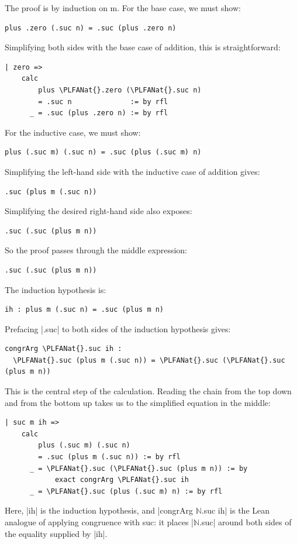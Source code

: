 \documentclass{memoir}
\newcommand{\PLFANat}{\ensuremath{\mathbb{N}}}
\begin{document}
\par
\par\noindent The proof is by induction on m. For the base case, we must show:\begin{verbatim}
plus .zero (.suc n) = .suc (plus .zero n)
\end{verbatim}
Simplifying both sides with the base case of addition, this is straightforward:\begin{verbatim}
| zero =>
    calc
        plus \PLFANat{}.zero (\PLFANat{}.suc n)
        = .suc n              := by rfl
      _ = .suc (plus .zero n) := by rfl
\end{verbatim}

\par
\par\noindent For the inductive case, we must show:\begin{verbatim}
plus (.suc m) (.suc n) = .suc (plus (.suc m) n)
\end{verbatim}
Simplifying the left-hand side with the inductive case of addition gives:\begin{verbatim}
.suc (plus m (.suc n))
\end{verbatim}
Simplifying the desired right-hand side also exposes:\begin{verbatim}
.suc (.suc (plus m n))
\end{verbatim}
So the proof passes through the middle expression:\begin{verbatim}
.suc (.suc (plus m n))
\end{verbatim}
The induction hypothesis is:\begin{verbatim}
ih : plus m (.suc n) = .suc (plus m n)
\end{verbatim}
Prefacing \LeanVerb|.suc| to both sides of the induction hypothesis gives:\begin{verbatim}
congrArg \PLFANat{}.suc ih :
  \PLFANat{}.suc (plus m (.suc n)) = \PLFANat{}.suc (\PLFANat{}.suc (plus m n))
\end{verbatim}
This is the central step of the calculation. Reading the chain from the
top down and from the bottom up takes us to the simplified equation in the
middle:\begin{verbatim}
| suc m ih =>
    calc
        plus (.suc m) (.suc n)
        = .suc (plus m (.suc n)) := by rfl
      _ = \PLFANat{}.suc (\PLFANat{}.suc (plus m n)) := by
            exact congrArg \PLFANat{}.suc ih
      _ = \PLFANat{}.suc (plus (.suc m) n) := by rfl
\end{verbatim}
Here, \LeanVerb|ih| is the induction hypothesis, and \LeanVerb|congrArg \PLFANat{}.suc ih| is the Lean
analogue of applying congruence with suc: it places \LeanVerb|\PLFANat{}.suc| around both sides
of the equality supplied by \LeanVerb|ih|.
\end{document}
